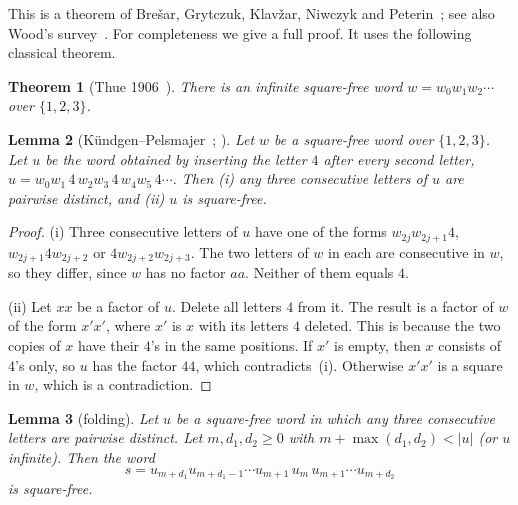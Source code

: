 \documentclass[11pt]{article}
\newtheorem{theorem}{Theorem}
\newtheorem{lemma}[theorem]{Lemma}
\theoremstyle{definition}
\theoremstyle{remark}
\begin{document}
This is a theorem of Bre\v{s}ar, Grytczuk, Klav\v{z}ar, Niwczyk and Peterin~\cite{BGKNP}; see
also Wood's survey~\cite[Thm.~4.1]{Wood}. For completeness we give a full proof. It uses the
following classical theorem.

\begin{theorem}[Thue 1906~\cite{Thue}]\label{thm:thue}
There is an infinite square-free word $w=w_0w_1w_2\cdots$ over $\{1,2,3\}$.
\end{theorem}

\begin{lemma}[K\"undgen--Pelsmajer~\cite{KP}; {\cite[Lemma~3.3]{Wood}}]\label{lem:kp}
Let $w$ be a square-free word over $\{1,2,3\}$. Let $u$ be the word obtained by inserting the
letter $4$ after every second letter,
$u=w_0w_1\,4\,w_2w_3\,4\,w_4w_5\,4\cdots$. Then (i) any three consecutive letters of $u$ are
pairwise distinct, and (ii) $u$ is square-free.
\end{lemma}

\begin{proof}
(i) Three consecutive letters of $u$ have one of the forms $w_{2j}w_{2j+1}4$,
$w_{2j+1}4w_{2j+2}$ or $4w_{2j+2}w_{2j+3}$. The two letters of $w$ in each are consecutive in $w$,
so they differ, since $w$ has no factor $aa$. Neither of them equals $4$.

(ii) Let $xx$ be a factor of $u$. Delete all letters $4$ from it. The result is a factor of $w$
of the form $x'x'$, where $x'$ is $x$ with its letters $4$ deleted. This is because the two copies
of $x$ have their $4$'s in the same positions. If $x'$ is empty, then $x$ consists of $4$'s only,
so $u$ has the factor $44$, which contradicts~(i). Otherwise $x'x'$ is a square in $w$, which is
a contradiction.
\end{proof}

\begin{lemma}[folding]\label{lem:fold}
Let $u$ be a square-free word in which any three consecutive letters are pairwise distinct. Let
$m,d_1,d_2\ge0$ with $m+\max(d_1,d_2)<|u|$ (or $u$ infinite). Then the word
\[
s=u_{m+d_1}u_{m+d_1-1}\cdots u_{m+1}\,u_m\,u_{m+1}\cdots u_{m+d_2}
\]
is square-free.
\end{lemma}
\end{document}
